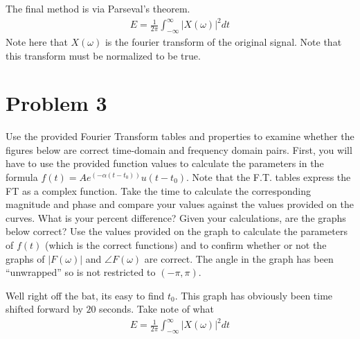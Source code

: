 \documentclass{article}
\begin{document}
The final method is via Parseval's theorem.
\begin{align*}
E = \frac{1}{2\pi} \int_{-\infty}^{\infty} |X(\omega )|^2 dt
\end{align*}
Note here that $X(\omega )$ is the fourier transform of the original signal. Note that this transform must be normalized to be true.

\section*{Problem 3}
Use the provided Fourier Transform tables and properties to examine whether the figures below are correct time-domain and frequency domain pairs. First, you will have to use the provided function values to calculate the parameters in the formula $f(t)=A e^{(-\alpha(t-t_0) )} u(t-t_0)$. Note that the F.T. tables express the FT as a complex function. Take the time to calculate the corresponding magnitude and phase and compare your values against the values provided on the curves. What is your percent difference? Given your calculations, are the graphs below correct? Use the values provided on the graph to calculate the parameters of $f(t)$ (which is the correct functions) and to confirm whether or not the graphs of $|F(\omega)|$ and $\angle F(\omega )$ are correct. The angle in the graph has been “unwrapped” so is not restricted to $(-\pi,\pi)$.

Well right off the bat, its easy to find $t_0$. This graph has obviously been time shifted forward by $20$ seconds. Take note of what
\begin{align*}
E = \frac{1}{2\pi} \int_{-\infty}^{\infty} |X(\omega )|^2 dt
\end{align*}
\end{document}
